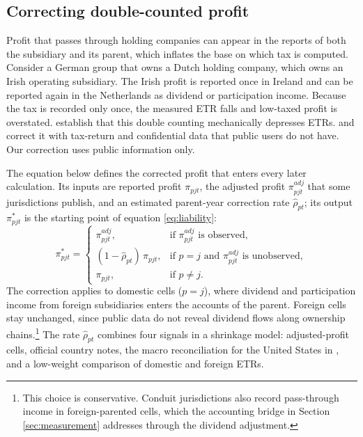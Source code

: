 \documentclass[11pt,a4paper]{article}
\begin{document}


\subsection{Correcting double-counted profit}\label{sec:doublecounting}

Profit that passes through holding companies can appear in the reports of both the subsidiary and its parent, which inflates the base on which tax is computed. Consider a German group that owns a Dutch holding company, which owns an Irish operating subsidiary. The Irish profit is reported once in Ireland and can be reported again in the Netherlands as dividend or participation income. Because the tax is recorded only once, the measured ETR falls and low-taxed profit is overstated. \citet{blouin2023} establish that this double counting mechanically depresses ETRs. \citet{garcia-bernardo2022a} and \citet{hugger2026} correct it with tax-return and confidential data that public users do not have. Our correction uses public information only.

The equation below defines the corrected profit that enters every later calculation. Its inputs are reported profit $\pi_{pjt}$, the adjusted profit $\pi^{adj}_{pjt}$ that some jurisdictions publish, and an estimated parent-year correction rate $\hat\rho_{pt}$; its output $\pi^{*}_{pjt}$ is the starting point of equation \eqref{eq:liability}:
\begin{equation}\label{eq:profit_correction}
\pi^{*}_{pjt} =
\begin{cases}
\pi^{adj}_{pjt}, & \text{if } \pi^{adj}_{pjt} \text{ is observed},\\
(1-\hat\rho_{pt})\,\pi_{pjt}, & \text{if } p=j \text{ and } \pi^{adj}_{pjt} \text{ is unobserved},\\
\pi_{pjt}, & \text{if } p\neq j.
\end{cases}
\end{equation}
The correction applies to domestic cells ($p=j$), where dividend and participation income from foreign subsidiaries enters the accounts of the parent. Foreign cells stay unchanged, since public data do not reveal dividend flows along ownership chains.\footnote{This choice is conservative. Conduit jurisdictions also record pass-through income in foreign-parented cells, which the accounting bridge in Section \ref{sec:measurement} addresses through the dividend adjustment.} The rate $\hat\rho_{pt}$ combines four signals in a shrinkage model: adjusted-profit cells, official country notes, the macro reconciliation for the United States in \citet{garcia-bernardo2022a}, and a low-weight comparison of domestic and foreign ETRs.
\end{document}
